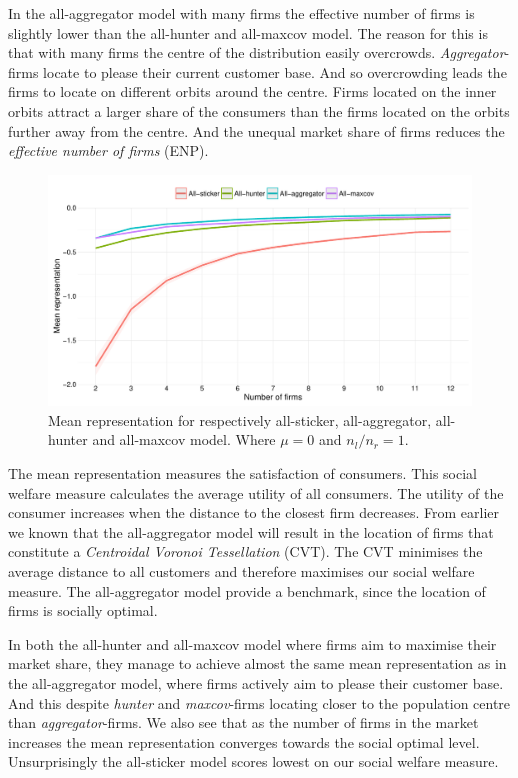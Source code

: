 \documentclass[preprint, 12pt]{elsarticle}
\begin{document}
In the all-aggregator model with many firms the effective number of firms is slightly lower than the all-hunter and all-maxcov model. The reason for this is that with many firms the centre of the distribution easily overcrowds. \emph{Aggregator}-firms locate to please their current customer base. And so overcrowding leads the firms to locate on different orbits around the centre. Firms located on the inner orbits attract a larger share of the consumers than the firms located on the orbits further away from the centre. And the unequal market share of firms reduces the \emph{effective number of firms} (ENP).

\begin{figure}[ht!]
	\centering
	\includegraphics[width=\textwidth]{Graphics/fig23a.pdf}
	\caption{Mean representation for respectively all-sticker, all-aggregator, all-hunter and all-maxcov model. Where $\mu=0$ and $n_l/n_r=1$.}
	\label{fig:representation}
\end{figure}

The mean representation measures the satisfaction of consumers. This social welfare measure calculates the average utility of all consumers. The utility of the consumer increases when the distance to the closest firm decreases. From earlier we known that the all-aggregator model will result in the location of firms that constitute a \emph{Centroidal Voronoi Tessellation} (CVT). The CVT minimises the average distance to all customers and therefore maximises our social welfare measure. The all-aggregator model provide a benchmark, since the location of firms is socially optimal.

In both the all-hunter and all-maxcov model where firms aim to maximise their market share, they manage to achieve almost the same mean representation as in the all-aggregator model, where firms actively aim to please their customer base. And this despite \emph{hunter} and \emph{maxcov}-firms locating closer to the population centre than \emph{aggregator}-firms. We also see that as the number of firms in the market increases the mean representation converges towards the social optimal level. Unsurprisingly the all-sticker model scores lowest on our social welfare measure.
\end{document}
